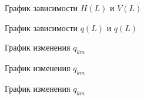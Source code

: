 \documentclass[bachelor,subf,14pt, substylefile = spbu.rtx]{disser}
\begin{document}
\begin{figure}[H]
\centering

\caption{График зависимости $H(L)$ и $V(L)$}
\label{fig:FL_H_V_opt}
\end{figure}


\begin{figure}[H]
\centering

\label{fig:H_300_L_m}
\caption{График зависимости $q(L)$ и $q(L)$}
\end{figure}



\begin{table}[H]
\centering
\resizebox{\textwidth-1.4cm}{!}{
    
}
\caption{$q_{km}\, [\frac{кг}{км}], V \, [\frac{м}{с}] $}
\label{t:1}
\end{table}

\begin{figure}[H]
\centering
\scalebox{0.8}{}
\caption{График изменения $q_{km}$}
\label{fig:q_km_1}
\end{figure}
\begin{figure}[H]
\centering
\scalebox{0.8}{}
\caption{График изменения $q_{km}$}
\label{fig:q_km_2}
\end{figure}
\begin{figure}[H]
\centering
\scalebox{0.8}{}
\caption{График изменения $q_{km}$}
\label{fig:q_km_3}
\end{figure}
\end{document}
